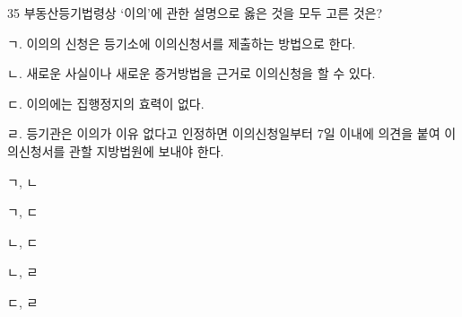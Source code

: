 \begin{question}{35}
부동산등기법령상 ‘이의’에 관한 설명으로 옳은 것을 모두 고른 것은?
\begin{framedtext}
ㄱ. 이의의 신청은 등기소에 이의신청서를 제출하는 방법으로 한다. \par
ㄴ. 새로운 사실이나 새로운 증거방법을 근거로 이의신청을 할 수 있다. \par
ㄷ. 이의에는 집행정지의 효력이 없다. \par
ㄹ. 등기관은 이의가 이유 없다고 인정하면 이의신청일부터 7일 이내에 의견을 붙여 이의신청서를 관할 지방법원에 보내야 한다. \par
\end{framedtext}
\begin{choices}
  \item ㄱ, ㄴ
  \item ㄱ, ㄷ
  \item ㄴ, ㄷ
  \item ㄴ, ㄹ
  \item ㄷ, ㄹ
\end{choices}
\end{question}
